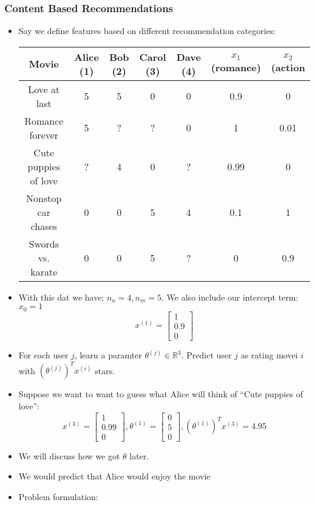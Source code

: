 \subsubsection{Content Based Recommendations}
\begin{itemize}[--]
	\item Say we define features based on different recommendation categories: \\
	\begin{center}\begin{tabular}{c | c c c c | c c}
		\textbf{Movie} & \textbf{Alice (1)} & \textbf{Bob (2)} & \textbf{Carol (3)} & \textbf{Dave (4)} & $x_1$ (romance) & $x_2$ (action\\ \hline
		Love at last & 5 & 5 & 0 & 0 & 0.9 & 0\\
		Romance forever & 5 & ? & ? & 0 & 1 & 0.01\\
		Cute puppies of love & ? & 4 & 0 & ? & 0.99 & 0\\
		Nonstop car chases & 0 & 0 & 5 & 4 & 0.1 & 1\\
		Swords vs. karate & 0 & 0 &  5 & ? & 0 & 0.9
	\end{tabular}\end{center}
	\item With this dat we have: $n_u=4, n_m=5$. We also include our intercept term: $x_0=1$
		$$x^{(1)}=\begin{bmatrix}
			1\\
			0.9\\
			0
		\end{bmatrix}$$
	\item For each user $j$, learn a paramter $\theta^{(j)}\in\mathbb{R}^3$. Predict user $j$ as rating movei $i$ with $(\theta^{(j)})^T x^{(i)}$ stars.
	\item Suppose we want to want to guess what Alice will think of ``Cute puppies of love'':
		$$x^{(3)}=\begin{bmatrix}
			1 \\ 0.99 \\ 0
		\end{bmatrix}, \theta^{(1)}=\begin{bmatrix}
			0 \\ 5 \\ 0
		\end{bmatrix}, (\theta^{(1)})^T x^{(3)} = 4.95$$
	\item We will discuss how we got $\theta$ later.
	\item We would predict that Alice would enjoy the movie 
	\item Problem formulation:

\end{itemize}
